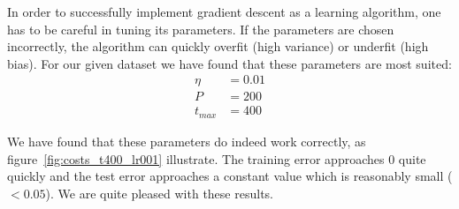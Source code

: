 In order to successfully implement gradient descent as a learning algorithm, one has to be careful in tuning its parameters. 
If the parameters are chosen incorrectly, the algorithm can quickly overfit (high variance) or underfit (high bias).
For our given dataset we have found that these parameters are most suited:
\begin{align*}
\eta &= 0.01 \\
P &= 200 \\
t_{max} &= 400
\end{align*}

We have found that these parameters do indeed work correctly, as figure~\ref{fig:costs_t400_lr001} illustrate. 
The training error approaches 0 quite quickly and the test error approaches a constant value which is reasonably small (\(< 0.05\)).
We are quite pleased with these results.